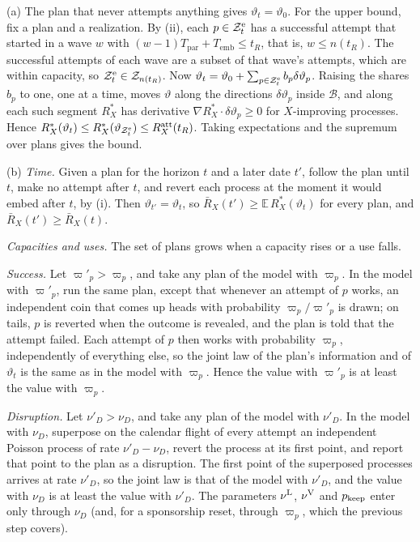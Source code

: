 (a) The plan that never attempts anything gives $\vartheta_t=\vartheta_0$. For the upper bound, fix a plan and a realization. By (ii), each $p\in\mathcal Z^{\rm e}_t$ has a successful attempt that started in a wave $w$ with $(w-1)T_{\mathrm{par}}+T_{\mathrm{emb}}\le t_R$, that is, $w\le n(t_R)$. The successful attempts of each wave are a subset of that wave's attempts, which are within capacity, so $\mathcal Z^{\rm e}_t\in\mathcal Z_{n(t_R)}$. Now $\vartheta_t=\vartheta_0+\sum_{p\in\mathcal Z^{\rm e}_t}b_p\delta\vartheta_p$. Raising the shares $b_p$ to one, one at a time, moves $\vartheta$ along the directions $\delta\vartheta_p$ inside $\mathcal B$, and along each such segment $R^*_X$ has derivative $\nabla R^*_X\cdot\delta\vartheta_p\ge0$ for $X$-improving processes. Hence $R^*_X(\vartheta_t)\le R^*_X(\vartheta_{\mathcal Z^{\rm e}_t})\le R^{\mathrm{att}}_X(t_R)$. Taking expectations and the supremum over plans gives the bound.

(b) \emph{Time.} Given a plan for the horizon $t$ and a later date $t'$, follow the plan until $t$, make no attempt after $t$, and revert each process at the moment it would embed after $t$, by (i). Then $\vartheta_{t'}=\vartheta_t$, so $\bar R_X(t')\ge\mathbb E\,R^*_X(\vartheta_t)$ for every plan, and $\bar R_X(t')\ge\bar R_X(t)$.

\emph{Capacities and uses.} The set of plans grows when a capacity rises or a use falls.

\emph{Success.} Let $\varpi'_p>\varpi_p$, and take any plan of the model with $\varpi_p$. In the model with $\varpi'_p$, run the same plan, except that whenever an attempt of $p$ works, an independent coin that comes up heads with probability $\varpi_p/\varpi'_p$ is drawn; on tails, $p$ is reverted when the outcome is revealed, and the plan is told that the attempt failed. Each attempt of $p$ then works with probability $\varpi_p$, independently of everything else, so the joint law of the plan's information and of $\vartheta_t$ is the same as in the model with $\varpi_p$. Hence the value with $\varpi'_p$ is at least the value with $\varpi_p$.

\emph{Disruption.} Let $\nu'_D>\nu_D$, and take any plan of the model with $\nu'_D$. In the model with $\nu_D$, superpose on the calendar flight of every attempt an independent Poisson process of rate $\nu'_D-\nu_D$, revert the process at its first point, and report that point to the plan as a disruption. The first point of the superposed processes arrives at rate $\nu'_D$, so the joint law is that of the model with $\nu'_D$, and the value with $\nu_D$ is at least the value with $\nu'_D$. The parameters $\nu^{\rm L}$, $\nu^{\rm V}$ and $p_{\rm keep}$ enter only through $\nu_D$ (and, for a sponsorship reset, through $\varpi_p$, which the previous step covers).

